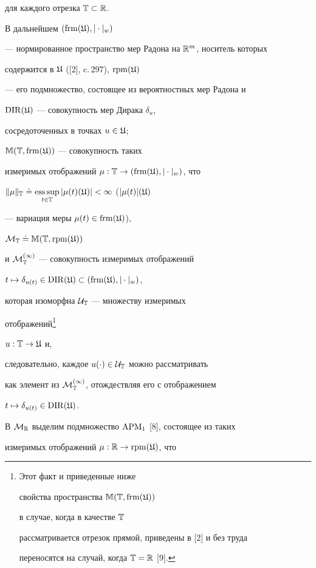 для каждого отрезка $\Bbb T\subset\Bbb R$.


В дальнейшем $(\operatorname{frm}(\frak U),|\cdot|_w)$


--- нормированное пространство мер Радона на $\Bbb R^m$, носитель которых


содержится в $\frak U$ ([2], c.\,297), $\operatorname{rpm}(\frak U)$


--- его подмножество, состоящее из вероятностных мер Радона и


$\operatorname{DIR}(\frak U)$ --- совокупность мер Дирака $\delta_{u}$,


сосредоточенных в точках $u\in\frak U$;


$\Bbb M(\Bbb T,\operatorname{frm}(\frak U))$ --- совокупность таких


измеримых отображений $\mu:\bT\to


(\frm(\frak U), |\cdot|_w)$, что


$\|\mu\|_{\bT}\doteq\esssup\limits_{t\in\bT}


|\mu(t)(\frak U)|<\infty $ ($|\mu(t)|(\frak U)$


--- вариация меры $\mu(t)\in\operatorname{frm}(\frak U)$),


$\cal M_{\Bbb T}\doteq\Bbb M(\Bbb T,\operatorname{rpm}(\frak U))$


и $\cal M_{\Bbb T}^{(1)}$ --- совокупность измеримых отображений


$t\mapsto\delta_{u(t)}\in\DIR(\frak U)\subset


(\frm(\frak U),|\cdot|_w)$,


которая изоморфна $\cal U_{\Bbb T}$ --- множеству измеримых


отображений\footnote{Этот факт и приведенные ниже


свойства пространства $\Bbb M(\Bbb T,\operatorname{frm}(\frak U))$


в случае, когда в качестве $\Bbb T$


рассматривается отрезок прямой, приведены в [2] и без труда


переносятся на случай, когда $\Bbb T=\Bbb R$ [9].}


$u:\Bbb T\to\frak U$ и, 


следовательно, каждое $u(\cdot)\in\cal U_{\Bbb T}$ можно рассматривать


как элемент из $\cal M_{\Bbb T}^{(1)}$, отождествляя его с отображением


$t\mapsto\delta_{u(t)}\in\operatorname{DIR}(\frak U)$.


В $\cal M_{\Bbb R}$ выделим подмножество $\operatorname{APM}_1$ [8], состоящее из таких 


измеримых отображений $\mu:\Bbb R\to\operatorname{rpm}(\frak U)$, что


